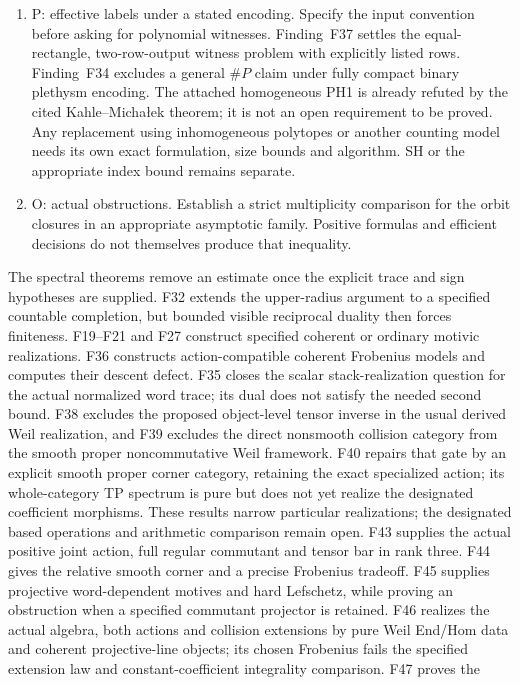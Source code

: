 \documentclass[11pt,a4paper]{article}
\newcommand{\fid}[1]{\textsf{#1}}\newcommand{\gate}[1]{\textsf{#1}}
\theoremstyle{named}\newtheorem{finding}{Finding}[section]
\theoremstyle{definition}\newtheorem{definition}[finding]{Definition}
\theoremstyle{remark}\newtheorem{remark}[finding]{Remark}
\begin{document}
\begin{enumerate}
\item \gate{P: effective labels under a stated encoding.} Specify the input convention before asking for polynomial witnesses. Finding~\fid{F37} settles the equal-rectangle, two-row-output witness problem with explicitly listed rows. Finding~\fid{F34} excludes a general \(\#P\) claim under fully compact binary plethysm encoding. The attached homogeneous PH1 is already refuted by the cited Kahle--Micha{\l}ek theorem; it is not an open requirement to be proved. Any replacement using inhomogeneous polytopes or another counting model needs its own exact formulation, size bounds and algorithm. SH or the appropriate index bound remains separate.
\item \gate{O: actual obstructions.} Establish a strict multiplicity comparison for the orbit closures in an appropriate asymptotic family. Positive formulas and efficient decisions do not themselves produce that inequality.
\end{enumerate}
The spectral theorems remove an estimate once the explicit trace and sign hypotheses are supplied. F32 extends the upper-radius argument to a specified countable completion, but bounded visible reciprocal duality then forces finiteness. F19--F21 and F27 construct specified coherent or ordinary motivic realizations. F36 constructs action-compatible coherent Frobenius models and computes their descent defect. F35 closes the scalar stack-realization question for the actual normalized word trace; its dual does not satisfy the needed second bound. F38 excludes the proposed object-level tensor inverse in the usual derived Weil realization, and F39 excludes the direct nonsmooth collision category from the smooth proper noncommutative Weil framework. F40 repairs that gate by an explicit smooth proper corner category, retaining the exact specialized action; its whole-category TP spectrum is pure but does not yet realize the designated coefficient morphisms. These results narrow particular realizations; the designated based operations and arithmetic comparison remain open.  F43 supplies the actual positive joint action, full regular
commutant and tensor bar in rank three. F44 gives the relative
smooth corner and a precise Frobenius tradeoff. F45 supplies
projective word-dependent motives and hard Lefschetz, while proving
an obstruction when a specified commutant projector is retained.
F46 realizes the actual algebra, both actions and collision
extensions by pure Weil End/Hom data and coherent projective-line
objects; its chosen Frobenius fails the specified extension law
and constant-coefficient integrality comparison. F47 proves the
\end{document}
